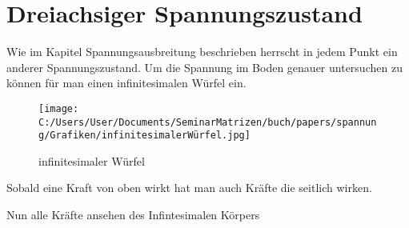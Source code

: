 \section{Dreiachsiger Spannungszustand\label{spannung:section:Dreiachsiger Spannungszustand}}
Wie im Kapitel Spannungsausbreitung beschrieben herrscht in jedem Punkt ein anderer Spannungszustand.
Um die Spannung im Boden genauer untersuchen zu können für man einen infinitesimalen Würfel ein.
\begin{figure}
	\texttt{[image: C:/Users/User/Documents/SeminarMatrizen/buch/papers/spannung/Grafiken/infinitesimalerWürfel.jpg]}
	\caption{infinitesimaler Würfel}
	\label{fig:infintesimaler-wurfel}
\end{figure}

Sobald eine Kraft von oben wirkt hat man auch Kräfte die seitlich wirken.

Nun alle Kräfte ansehen des Infintesimalen Körpers


